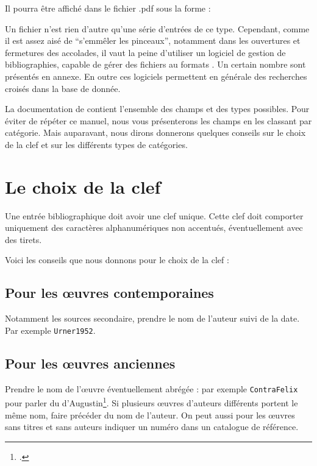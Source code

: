 Il pourra être affiché dans le fichier .pdf sous la forme :

\begin{quotation}
\cite{Urner1952}
\end{quotation}



Un fichier  n'est rien d'autre qu'une  série d'entrées de ce type. Cependant, comme il est assez aisé de \enquote{s'emmêler les pinceaux}, notamment dans les ouvertures et fermetures des accolades, il vaut la peine d'utiliser un logiciel de gestion de bibliographies, capable de gérer  des fichiers au formats . Un certain nombre sont présentés en annexe. En outre ces logiciels permettent en générale des recherches croisés dans la base de donnée.

La documentation de  contient l'ensemble des champs et des types possibles. Pour éviter de répéter ce manuel, nous vous présenterons les champs en les classant par catégorie. Mais auparavant, nous dirons donnerons quelques conseils sur le choix de la clef et sur les différents types de catégories.

\section{Le choix de la clef}

Une entrée bibliographique doit avoir une clef unique. Cette clef doit comporter uniquement des caractères alphanumériques non accentués, éventuellement avec des tirets. 




Voici les conseils que nous donnons pour le choix de la clef :
\subsection{Pour les œuvres contemporaines}
Notamment les sources secondaire, prendre le nom de l'auteur suivi de la date. Par exemple \verb|Urner1952|.

\subsection{Pour les œuvres anciennes}

Prendre le nom de l'œuvre  éventuellement abrégée : par exemple \verb|ContraFelix| pour parler du  d'Augustin\footcite{ContraFelix}. Si plusieurs œuvres d'auteurs différents portent le même nom, faire précéder du nom de l'auteur. On peut aussi pour les œuvres sans titres et sans auteurs indiquer un numéro dans un catalogue de référence.



